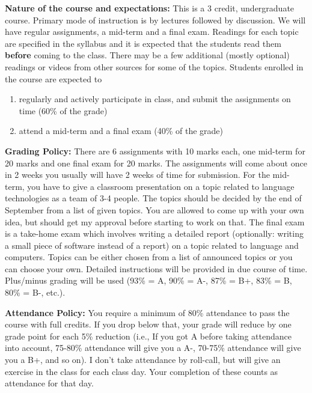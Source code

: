 \documentclass[11pt,a4paper]{article}
\begin{document}
\bigskip \textbf{Nature of the course and expectations:} This is a 3 credit, undergraduate course. Primary mode of instruction is by lectures followed by discussion. We will have regular assignments, a mid-term and a final exam. Readings for each topic are specified in the syllabus and it is expected that the students read them \textbf{before} coming to the class. There may be a few additional (mostly optional) readings or videos from other sources for some of the topics.  Students enrolled in the course are expected to 
\begin{enumerate}
\item regularly and actively participate in class, and submit the assignments on time (60\% of the grade)
\item attend a mid-term and a final exam (40\% of the grade)
\end{enumerate}

\bigskip\textbf{\large Grading Policy: }
There are 6 assignments with 10 marks each, one mid-term for 20 marks and one final exam for 20 marks. The assignments will come about once in 2 weeks you usually will have 2 weeks of time for submission. For the mid-term, you have to give a classroom presentation on a topic related to language technologies as a team of 3-4 people. The topics should be decided by the end of September from a list of given topics. You are allowed to come up with your own idea, but should get my approval before starting to work on that.  The final exam is a take-home exam which involves writing a detailed report (optionally: writing a small piece of software instead of a report) on a topic related to language and computers. Topics can be either chosen from a list of announced topics or you can choose your own. Detailed instructions will be provided in due course of time. Plus/minus grading will be used (93\% = A, 90\% = A-, 87\% = B+, 83\% = B, 80\% = B-, etc.). 

\bigskip\textbf{\large Attendance Policy: } You require a minimum of 80\% attendance to pass the course with full credits. If you drop below that, your grade will reduce by one grade point for each 5\% reduction (i.e., If you got A before taking attendance into account, 75-80\% attendance will give you a A-, 70-75\% attendance will give you a B+, and so on). I don't take attendance by roll-call, but will give an exercise in the class for each class day. Your completion of these counts as attendance for that day. 
\end{document}

